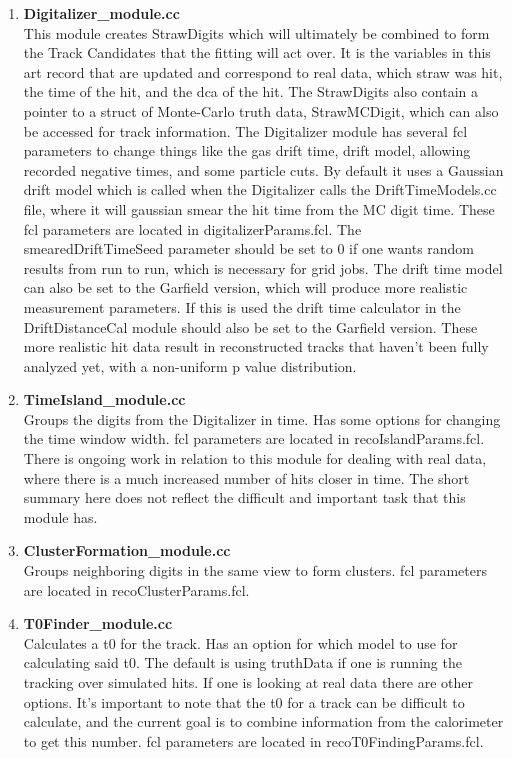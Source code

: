 \documentclass{article}
\begin{document}
    \begin{enumerate}

          \item{\bf{Digitalizer\_module.cc}} \\
          This module creates StrawDigits which will ultimately be combined to form the Track Candidates that the fitting will act over. It is the variables in this art record that are updated and correspond to real data, which straw was hit, the time of the hit, and the dca of the hit. The StrawDigits also contain a pointer to a struct of Monte-Carlo truth data, StrawMCDigit, which can also be accessed for track information. The Digitalizer module has several fcl parameters to change things like the gas drift time, drift model, allowing recorded negative times, and some particle cuts. By default it uses a Gaussian drift model which is called when the Digitalizer calls the DriftTimeModels.cc file, where it will gaussian smear the hit time from the MC digit time. These fcl parameters are located in digitalizerParams.fcl. The smearedDriftTimeSeed parameter should be set to 0 if one wants random results from run to run, which is necessary for grid jobs. The drift time model can also be set to the Garfield version, which will produce more realistic measurement parameters. If this is used the drift time calculator in the DriftDistanceCal module should also be set to the Garfield version. These more realistic hit data result in reconstructed tracks that haven't been fully analyzed yet, with a non-uniform p value distribution.

          \item{\bf{TimeIsland\_module.cc}} \\
          Groups the digits from the Digitalizer in time. Has some options for changing the time window width. fcl parameters are located in recoIslandParams.fcl. There is ongoing work in relation to this module for dealing with real data, where there is a much increased number of hits closer in time. The short summary here does not reflect the difficult and important task that this module has.

          \item{\bf{ClusterFormation\_module.cc}} \\
          Groups neighboring digits in the same view to form clusters. fcl parameters are located in recoClusterParams.fcl.

          \item{\bf{T0Finder\_module.cc}} \\
          Calculates a t0 for the track. Has an option for which model to use for calculating said t0. The default is using truthData if one is running the tracking over simulated hits. If one is looking at real data there are other options. It's important to note that the t0 for a track can be difficult to calculate, and the current goal is to combine information from the calorimeter to get this number. fcl parameters are located in recoT0FindingParams.fcl.


\end{enumerate}
\end{document}
